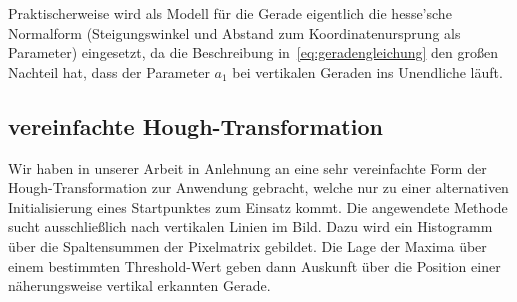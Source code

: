 Praktischerweise wird als Modell für die Gerade eigentlich die hesse'sche Normalform (Steigungswinkel und Abstand zum Koordinatenursprung als Parameter) eingesetzt, da die Beschreibung in~\ref{eq:geradengleichung} den großen Nachteil hat, dass der Parameter \( a_1 \) bei vertikalen Geraden ins Unendliche läuft. 

\subsection{vereinfachte Hough-Transformation}
\label{ssec:grundlagen:hough:vereinfachte}
Wir haben in unserer Arbeit in Anlehnung an \autocite{alyRealTimeDetection2008} eine sehr vereinfachte Form der Hough-Transformation zur Anwendung gebracht, welche nur zu einer alternativen Initialisierung eines Startpunktes zum Einsatz kommt. Die angewendete Methode sucht ausschließlich nach vertikalen Linien im Bild. Dazu wird ein Histogramm über die Spaltensummen der Pixelmatrix gebildet. Die Lage der Maxima über einem bestimmten Threshold-Wert geben dann Auskunft über die Position einer näherungsweise vertikal erkannten Gerade.